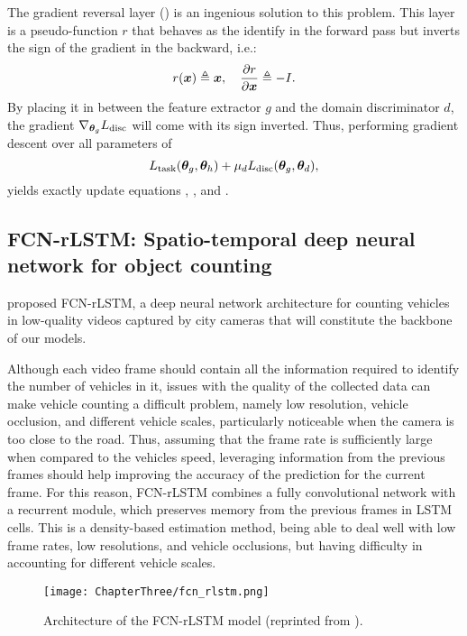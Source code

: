 The gradient reversal layer (\citet{Ganin2015}) is an ingenious solution to this problem. This layer is a pseudo-function $r$ that behaves as the identify in the forward pass but inverts the sign of the gradient in the backward, i.e.:
\begin{equation}
	r({\bm{x}}) \triangleq {\bm{x}}, \quad \frac{\partial r}{\partial {\bm{x}}} \triangleq -I.
\end{equation}
By placing it in between the feature extractor $g$ and the domain discriminator $d$, the gradient $\nabla_{{\bm{\theta}}_g} L_{\text{disc}}$ will come with its sign inverted. Thus, performing gradient descent over all parameters of
\begin{equation}
	L_{\text{task}}({\bm{\theta}}_g, {\bm{\theta}}_h) + \mu_d L_{\text{disc}}({\bm{\theta}}_g, {\bm{\theta}}_d),
\end{equation}
yields exactly update equations , , and .

\subsection{FCN-rLSTM: Spatio-temporal deep neural network for object counting}
\label{sec:da_sensors_fcn_rltsm}

\citet{Zhang2017} proposed FCN-rLSTM, a deep neural network architecture for counting vehicles in low-quality videos captured by city cameras that will constitute the backbone of our models.

Although each video frame should contain all the information required to identify the number of vehicles in it, issues with the quality of the collected data can make vehicle counting a difficult problem, namely low resolution, vehicle occlusion, and different vehicle scales, particularly noticeable when the camera is too close to the road. Thus, assuming that the frame rate is sufficiently large when compared to the vehicles speed, leveraging information from the previous frames should help improving the accuracy of the prediction for the current frame. For this reason, FCN-rLSTM combines a fully convolutional network with a recurrent module, which preserves memory from the previous frames in LSTM cells. This is a density-based estimation method, being able to deal well with low frame rates, low resolutions, and vehicle occlusions, but having difficulty in accounting for different vehicle scales.

\begin{figure}
	\centering
	\texttt{[image: ChapterThree/fcn\_rlstm.png]}
	\caption{Architecture of the FCN-rLSTM model (reprinted from \citet{Zhang2017}).}
	\label{fig:fcn_rlstm}
\end{figure}


